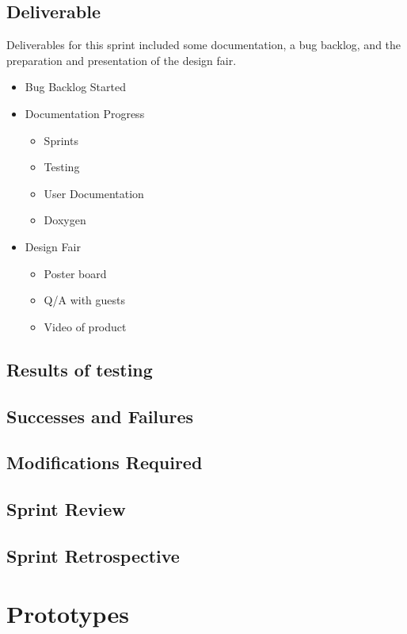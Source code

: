 \subsection{Deliverable}

Deliverables for this sprint included some documentation, a bug backlog, and the preparation and presentation of the design fair. 

\begin{itemize}
	\item Bug Backlog Started
	\item Documentation	Progress	
	\begin{itemize}
		\item Sprints
		\item Testing
		\item User Documentation
		\item Doxygen
	\end{itemize}
	\item Design Fair	
	\begin{itemize}
    	\item Poster board
    	\item Q/A with guests
    	\item Video of product
	\end{itemize}
\end{itemize}

\subsection{Results of testing}


\subsection{Successes and Failures}


\subsection{Modifications Required}


\subsection{Sprint Review}


\subsection{Sprint Retrospective}


\section{Prototypes}

